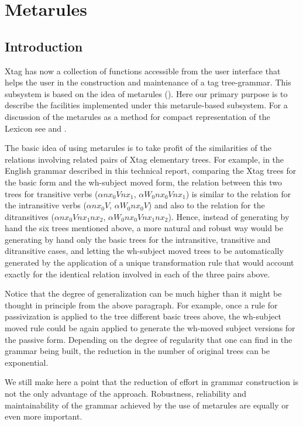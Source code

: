 \chapter{Metarules}
\label{metarules}

\section{Introduction}

Xtag has now a collection of functions accessible from the user interface that
helps the user in the construction and maintenance of a tag tree-grammar.
This subsystem is based on the idea of metarules (\cite{becker93}).
Here our primary
purpose is to describe the facilities implemented under this 
metarule-based subsystem.
For a discussion of the metarules as a method for compact representation 
of the Lexicon see \cite{becker93} and \cite{srini94}.

The basic idea of using metarules is to take profit of the similarities of the
relations involving related pairs of Xtag elementary trees. 
For example, in the English grammar described in this technical report,
comparing the Xtag trees for the basic form and the 
wh-subject moved form, the relation between this two trees for transitive verbs
($\alpha nx_0Vnx_1$, $\alpha W_0nx_0Vnx_1$) is similar to the relation for the
intransitive verbs ($\alpha nx_0V$, $\alpha W_0nx_0V$) and also to the 
relation for the ditransitives ($\alpha nx_0Vnx_1nx_2$, 
$\alpha W_0nx_0Vnx_1nx_2$). Hence, instead of generating by hand the six trees 
mentioned above, a more natural and robust way would be generating by hand 
only the basic trees for the intransitive, transitive and ditransitive cases, 
and letting the wh-subject moved trees to be automatically generated by the
application of a unique transformation rule that would account exactly for
the identical relation involved in each of the three pairs above.

Notice that the degree of generalization can be much higher than it might be
thought in principle from the above paragraph. For example, once a rule for
passivization is applied to the tree different basic trees above, the 
wh-subject moved rule could be again applied to generate the wh-moved subject
versions for the passive form. Depending on the degree of regularity that one
can find in the grammar being built, the reduction in the number of original
trees can be exponential. 

We still make here a point that the reduction of effort in grammar construction
is not the only advantage of the approach. Robustness, 
reliability and maintainability of the grammar achieved by the use of  
metarules are equally or even more important.

